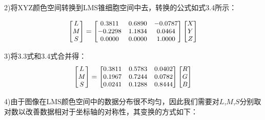 2)将XYZ颜色空间转换到LMS锥细胞空间中去，转换的公式如式3.4所示：

\begin{eqnarray} 
  \begin{small}     %
	\begin{bmatrix}
	  L\\  %
	  M\\  %
	  S\\  %
	\end{bmatrix}  
	= 
	\begin{bmatrix}
	  0.3811 & 0.6890 & -0.0787\\
	 -0.2298 & 1.1834 &  0.0464\\
	  0.0000 & 0.0000 &  1.0000\\
	\end{bmatrix} 
	\begin{bmatrix}
	  X\\
	  Y\\
	  Z\\
	\end{bmatrix}
  \end{small}
\end{eqnarray}

3)将3.3式和3.4式合并得：
\begin{eqnarray} 
\begin{small}     %
\begin{bmatrix}
    L\\  %
    M\\  %
    S\\  %
\end{bmatrix}  
= 
\begin{bmatrix}
    0.3811 & 0.5783 & 0.0402\\
    0.1967 & 0.7244 & 0.0782\\
    0.0241 & 0.1288 & 0.8444\\
\end{bmatrix} 
\begin{bmatrix}
	R\\
	G\\
	B\\
\end{bmatrix}
\end{small}
\end{eqnarray}

4)由于图像在LMS颜色空间中的数据分布很不均匀，因此我们需要对$L$,$M$,$S$分别取对数以改善数据相对于坐标轴的对称性，其变换的方式如下：

